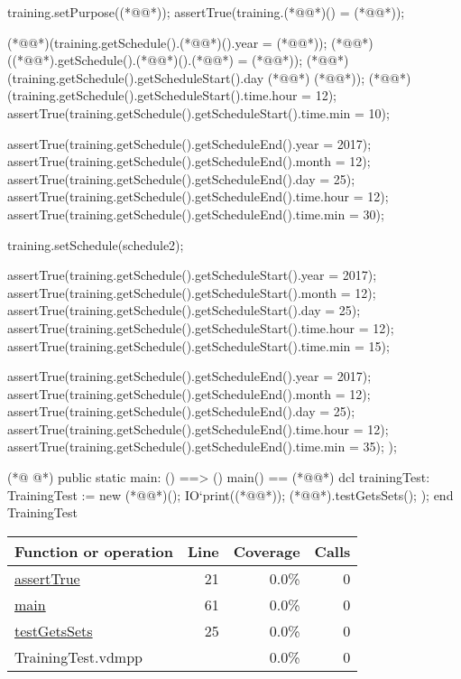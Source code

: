 \begin{vdmpp}[breaklines=true]
   training.setPurpose((*@@*));
   assertTrue(training.(*@@*)() = (*@@*));
   
   (*@@*)(training.getSchedule().(*@@*)().year = (*@@*));
   (*@@*)((*@@*).getSchedule().(*@@*)().(*@@*) = (*@@*));
   (*@@*)(training.getSchedule().getScheduleStart().day (*@\vdmnotcovered{=}@*) (*@@*));
   (*@@*)(training.getSchedule().getScheduleStart().time.hour = 12);
   assertTrue(training.getSchedule().getScheduleStart().time.min = 10);
   
   assertTrue(training.getSchedule().getScheduleEnd().year = 2017);
   assertTrue(training.getSchedule().getScheduleEnd().month = 12);
   assertTrue(training.getSchedule().getScheduleEnd().day = 25);
   assertTrue(training.getSchedule().getScheduleEnd().time.hour = 12);
   assertTrue(training.getSchedule().getScheduleEnd().time.min = 30);
   
   training.setSchedule(schedule2);
   
   assertTrue(training.getSchedule().getScheduleStart().year = 2017);
   assertTrue(training.getSchedule().getScheduleStart().month = 12);
   assertTrue(training.getSchedule().getScheduleStart().day = 25);
   assertTrue(training.getSchedule().getScheduleStart().time.hour = 12);
   assertTrue(training.getSchedule().getScheduleStart().time.min = 15);
   
   assertTrue(training.getSchedule().getScheduleEnd().year = 2017);
   assertTrue(training.getSchedule().getScheduleEnd().month = 12);
   assertTrue(training.getSchedule().getScheduleEnd().day = 25);
   assertTrue(training.getSchedule().getScheduleEnd().time.hour = 12);
   assertTrue(training.getSchedule().getScheduleEnd().time.min = 35);
  );

(*@
\label{main:61}
@*)
 public static main: () ==> ()
   main() == (*@\vdmnotcovered{(}@*)
    dcl trainingTest: TrainingTest := new (*@@*)();
    IO`print((*@@*));
    (*@@*).testGetsSets();
   );
end TrainingTest
\end{vdmpp}
\bigskip
\begin{longtable}{|l|r|r|r|}
\hline
Function or operation & Line & Coverage & Calls \\
\hline
\hline
\hyperref[assertTrue:21]{assertTrue} & 21&0.0\% & 0 \\
\hline
\hyperref[main:61]{main} & 61&0.0\% & 0 \\
\hline
\hyperref[testGetsSets:25]{testGetsSets} & 25&0.0\% & 0 \\
\hline
\hline
TrainingTest.vdmpp & & 0.0\% & 0 \\
\hline
\end{longtable}

